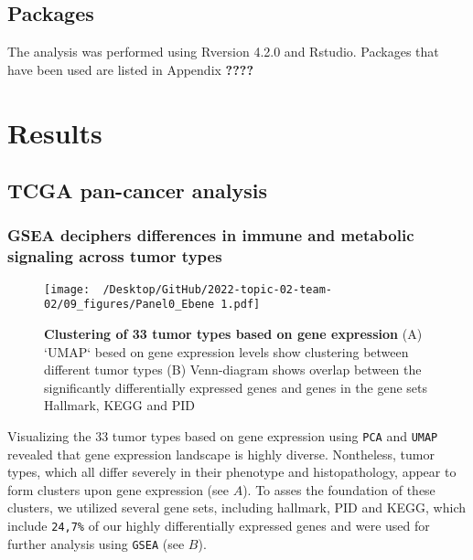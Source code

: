 \documentclass[
  parskip,
  oneside]{\documentclass[oneside]{book}}
\begin{document}
\hypertarget{packages}{%
\subsection{Packages}\label{packages}}

The analysis was performed using Rversion 4.2.0 and Rstudio. Packages
that have been used are listed in Appendix \textbf{????}

\hypertarget{results}{%
\section{Results}\label{results}}

\hypertarget{tcga-pan-cancer-analysis-1}{%
\subsection{TCGA pan-cancer analysis}\label{tcga-pan-cancer-analysis-1}}

\hypertarget{gsea-deciphers-differences-in-immune-and-metabolic-signaling-across-tumor-types}{%
\subsubsection{GSEA deciphers differences in immune and metabolic
signaling across tumor
types}\label{gsea-deciphers-differences-in-immune-and-metabolic-signaling-across-tumor-types}}

\begin{figure}[h]
 \begin{center}
   \texttt{[image: ~/Desktop/GitHub/2022-topic-02-team-02/09\_figures/Panel0\_Ebene 1.pdf]}
  \end{center}
  \caption{\textbf{Clustering of 33 tumor types based on gene expression} (A) `UMAP` besed on gene expression levels show clustering between different tumor types (B) Venn-diagram shows overlap between the significantly differentially expressed genes and genes in the gene sets Hallmark, KEGG and PID}
  \label{UMAP}
\end{figure}

Visualizing the 33 tumor types based on gene expression using
\texttt{PCA} and \texttt{UMAP} revealed that gene expression landscape
is highly diverse. Nontheless, tumor types, which all differ severely in
their phenotype and histopathology, appear to form clusters upon gene
expression (see  \(A\)). To asses the foundation of these
clusters, we utilized several gene sets, including hallmark, PID and
KEGG, which include \texttt{24,7\%} of our highly differentially
expressed genes and were used for further analysis using \texttt{GSEA}
(see  \(B\)).
\end{document}
